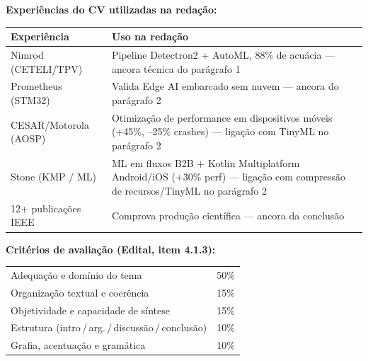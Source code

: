 \documentclass[12pt,a4paper]{article}
\begin{document}
\vspace{6mm}

\begin{mdframed}[backgroundcolor=metabg,linecolor=gray!50,linewidth=0.8pt,
                 innertopmargin=10pt,innerbottommargin=10pt,
                 innerleftmargin=10pt,innerrightmargin=10pt]
\textbf{\small Experi\^encias do CV utilizadas na reda\c{c}\~ao:}\\[6pt]
\small
\begin{tabular}{p{3.5cm}p{10cm}}
\toprule
\textbf{Experi\^encia} & \textbf{Uso na reda\c{c}\~ao} \\
\midrule
Nimrod (CETELI/TPV) &
  Pipeline Detectron2 + AutoML, 88\% de acu\'acia --- ancora t\'ecnica do
  par\'agrafo 1 \\[4pt]
Prometheus (STM32) &
  Valida Edge AI embarcado sem nuvem --- ancora do par\'agrafo 2 \\[4pt]
CESAR/Motorola (AOSP) &
  Otimiza\c{c}\~ao de performance em dispositivos m\'oveis (+45\%, --25\%
  crashes) --- liga\c{c}\~ao com TinyML no par\'agrafo 2 \\[4pt]
Stone (KMP / ML) &
  ML em fluxos B2B + Kotlin Multiplatform Android/iOS (+30\% perf) ---
  liga\c{c}\~ao com compress\~ao de recursos/TinyML no par\'agrafo 2 \\[4pt]
12+ publica\c{c}\~oes IEEE &
  Comprova produ\c{c}\~ao cient\'ifica --- ancora da conclus\~ao \\
\bottomrule
\end{tabular}
\end{mdframed}

\vspace{6mm}

\begin{mdframed}[backgroundcolor=metabg,linecolor=gray!50,linewidth=0.8pt,
                 innertopmargin=8pt,innerbottommargin=8pt,
                 innerleftmargin=10pt,innerrightmargin=10pt]
\textbf{\small Crit\'erios de avalia\c{c}\~ao (Edital, item 4.1.3):}\\[4pt]
\small
\begin{tabular}{lc}
Adequa\c{c}\~ao e dom\'inio do tema
  & 50\% \\
Organiza\c{c}\~ao textual e coer\^encia
  & 15\% \\
Objetividade e capacidade de s\'intese
  & 15\% \\
Estrutura (intro\,/\,arg.\,/\,discuss\~ao\,/\,conclus\~ao)
  & 10\% \\
Grafia, acentua\c{c}\~ao e gram\'atica
  & 10\% \\
\end{tabular}
\end{mdframed}
\end{document}
